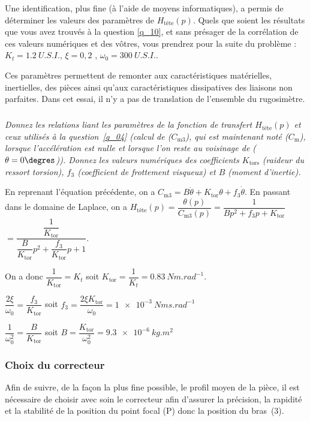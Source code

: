 \vspace{.25cm}

Une identification, plus fine (à l’aide de moyens informatiques), a permis de déterminer les valeurs des
paramètres de $H_{\text{tête}}(p)$. Quels que soient les résultats que vous avez trouvés à la question \ref{q_10}, et sans
présager de la corrélation de ces valeurs numériques et des vôtres, vous prendrez pour la suite du
problème : $K_t =\SI{1,2}{U.S.I.}$, $\xi = 0,2$ , $\omega_0 = \SI{300}{U.S.I.}$.


Ces paramètres permettent de remonter aux caractéristiques matérielles, inertielles, des pièces ainsi qu’aux
caractéristiques dissipatives des liaisons non parfaites. Dans cet essai, il n’y a pas de translation de
l’ensemble du rugosimètre.


\subparagraph{\label{q_11}}\textit{Donnez les relations liant les paramètres de la fonction de transfert 
$H_{\text{tête}}(p)$ et ceux utilisés à la question~\ref{q_04} (calcul de ($C_{\text{m3}}$), qui est maintenant noté
($C_{\text{m}}$), lorsque l’accélération est nulle et lorsque l’on reste au voisinage de ($\theta=0\degres$)).
Donnez les valeurs numériques des coefficients $K_{\text{tors}}$ (raideur du ressort torsion), $f_3$ (coefficient de
frottement visqueux) et $B$ (moment d’inertie). }
\ifprof
\begin{corrige}
En reprenant l'équation précédente, on a $ C_{\text{m3}} = B\ddot{\theta}  + K_{\text{tor}}\theta+ f_3 \dot{\theta}   $.
En passant dans le domaine de Laplace, on a $H_{\text{tête}}(p) = \dfrac{\theta(p)}{C_{\text{m3}}(p)} = \dfrac{1}{Bp^2+f_3p+K_{\text{tor}}}$ $= \dfrac{\dfrac{1}{K_{\text{tor}}}}{\dfrac{B}{K_{\text{tor}}}p^2+\dfrac{f_3}{K_{\text{tor}}}p+1}$.

On a donc $\dfrac{1}{K_{\text{tor}}} = K_t$ soit $K_{\text{tor}}=\dfrac{1}{K_t} = \SI{0,83}{Nm.rad^{-1}}$. 

$\dfrac{2\xi}{\omega_0} = \dfrac{f_3}{K_{\text{tor}}}$ soit $f_3 = \dfrac{2\xi K_{\text{tor}} }{\omega_0} = \SI{1e-3}{Nms.rad^{-1}}$

$\dfrac{1}{\omega_0^2} = \dfrac{B}{K_{\text{tor}}}$ soit $B=\dfrac{K_{\text{tor}}}{\omega_0^2 } = \SI{9,3e-6}{kg.m^2}$
\end{corrige}
\else
\fi

\subsubsection{Choix du correcteur}

Afin de suivre, de la façon la plus fine possible, le profil moyen de la pièce, il est nécessaire de choisir
avec soin le correcteur afin d’assurer la précision, la rapidité et la stabilité de la position du point focal (P)
donc la position du bras~(3).

